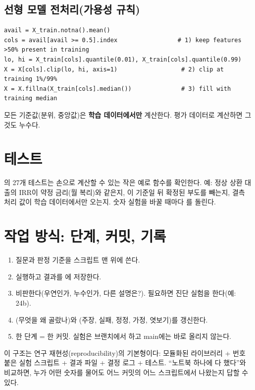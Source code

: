 \subsection*{선형 모델 전처리(가용성 규칙)}
\begin{lstlisting}
avail = X_train.notna().mean()
cols = avail[avail >= 0.5].index                 # 1) keep features >50% present in training
lo, hi = X_train[cols].quantile(0.01), X_train[cols].quantile(0.99)
X = X[cols].clip(lo, hi, axis=1)                  # 2) clip at training 1%/99%
X = X.fillna(X_train[cols].median())              # 3) fill with training median
\end{lstlisting}
모든 기준값(분위, 중앙값)은 \textbf{학습 데이터에서만} 계산한다. 평가 데이터로 계산하면 그것도 누수다.

\section{테스트}
의 27개 테스트는 손으로 계산할 수 있는 작은 예로 함수를 확인한다. 예: 정상 상환 대출의 IRR이 약정 금리(월 복리)와 같은지, 이 기준일 뒤 확정된 부도를 빼는지, 결측 처리 값이 학습 데이터에서만 오는지. 숫자 실험을 바꿀 때마다 를 돌린다.

\section{작업 방식: 단계, 커밋, 기록}
\begin{enumerate}[leftmargin=*]
\item 질문과 판정 기준을 스크립트 맨 위에 쓴다.
\item 실행하고 결과를 에 저장한다.
\item 비판한다(우연인가, 누수인가, 다른 설명은?). 필요하면 진단 실험을 한다(예: 24b).
\item {}(무엇을 왜 골랐나)와 (주장, 실패, 정정, 가정, 엿보기)를 갱신한다.
\item 한 단계 = 한 커밋. 실험은 브랜치에서 하고 main에는 바로 올리지 않는다.
\end{enumerate}

\begin{career}
이 구조는 연구 재현성(reproducibility)의 기본형이다: 모듈화된 라이브러리 + 번호 붙은 실험 스크립트 + 결과 파일 + 결정 로그 + 테스트. ``노트북 하나에 다 했다''와 비교하면, 누가 어떤 숫자를 물어도 어느 커밋의 어느 스크립트에서 나왔는지 답할 수 있다.
\end{career}
